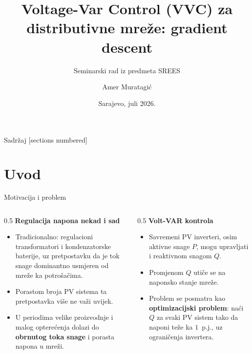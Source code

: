 \documentclass[10pt,aspectratio=169]{beamer}
\title{Voltage-Var Control (VVC) za distributivne mreže: gradient descent}
\subtitle{Seminarski rad iz predmeta SREES}
\author{Amer Muratagić}
\institute{Univerzitet u Sarajevu -- Elektrotehnički fakultet}
\date{Sarajevo, juli 2026.}
\begin{document}
{
\begin{frame}[plain]
  \titlepage
\end{frame}
}

\begin{frame}{Sadržaj}
  [sections numbered]
  \tableofcontents
\end{frame}

\section{Uvod}

\begin{frame}{Motivacija i problem}
  \begin{columns}[T,onlytextwidth]
    \begin{column}{0.5\textwidth}
      \textbf{Regulacija napona nekad i sad}
      \begin{itemize}
        \item Tradicionalno: regulacioni transformatori i kondenzatorske baterije, uz pretpostavku da je tok snage dominantno usmjeren od mreže ka potrošačima.
        \item Porastom broja PV sistema ta pretpostavka više ne važi uvijek.
        \item U periodima velike proizvodnje i malog opterećenja dolazi do \textbf{obrnutog toka snage} i porasta napona u mreži.
      \end{itemize}
    \end{column}
    \begin{column}{0.5\textwidth}
      \textbf{Volt-VAR kontrola}
      \begin{itemize}
        \item Savremeni PV inverteri, osim aktivne snage $P$, mogu upravljati i reaktivnom snagom $Q$.
        \item Promjenom $Q$ utiče se na naponsko stanje mreže.
        \item Problem se posmatra kao \textbf{optimizacijski problem}: naći $Q$ za svaki PV sistem tako da naponi teže ka $1$~p.j., uz ograničenja invertera.
      \end{itemize}
    \end{column}
  \end{columns}
\end{frame}
\end{document}
